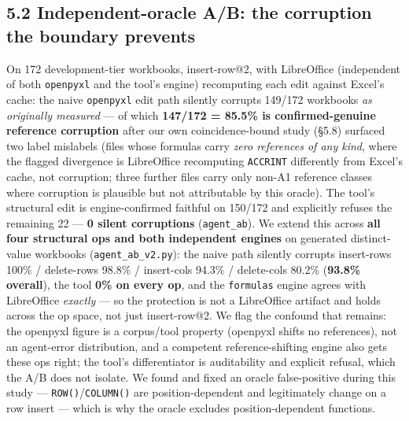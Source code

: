 \documentclass[
  11pt,
]{article}
\begin{document}
\subsection{5.2 Independent-oracle A/B: the corruption the boundary
prevents}\label{independent-oracle-ab-the-corruption-the-boundary-prevents}

On 172 development-tier workbooks, insert-row@2, with LibreOffice
(independent of both \texttt{openpyxl} and the tool's engine)
recomputing each edit against Excel's cache: the naive \texttt{openpyxl}
edit path silently corrupts 149/172 workbooks \emph{as originally
measured} --- of which \textbf{147/172 = 85.5\% is confirmed-genuine
reference corruption} after our own coincidence-bound study (§5.8)
surfaced two label mislabels (files whose formulas carry \emph{zero
references of any kind}, where the flagged divergence is LibreOffice
recomputing \texttt{ACCRINT} differently from Excel's cache, not
corruption; three further files carry only non-A1 reference classes
where corruption is plausible but not attributable by this oracle). The
tool's structural edit is engine-confirmed faithful on 150/172 and
explicitly refuses the remaining 22 --- \textbf{0 silent corruptions}
(\texttt{agent\_ab}). We extend this across \textbf{all four structural
ops and both independent engines} on generated distinct-value workbooks
(\texttt{agent\_ab\_v2.py}): the naive path silently corrupts
insert-rows 100\% / delete-rows 98.8\% / insert-cols 94.3\% /
delete-cols 80.2\% (\textbf{93.8\% overall}), the tool \textbf{0\% on
every op}, and the \texttt{formulas} engine agrees with LibreOffice
\emph{exactly} --- so the protection is not a LibreOffice artifact and
holds across the op space, not just insert-row@2. We flag the confound
that remains: the openpyxl figure is a corpus/tool property (openpyxl
shifts no references), not an agent-error distribution, and a competent
reference-shifting engine also gets these ops right; the tool's
differentiator is auditability and explicit refusal, which the A/B does
not isolate. We found and fixed an oracle false-positive during this
study --- \texttt{ROW()}/\texttt{COLUMN()} are position-dependent and
legitimately change on a row insert --- which is why the oracle excludes
position-dependent functions.
\end{document}
